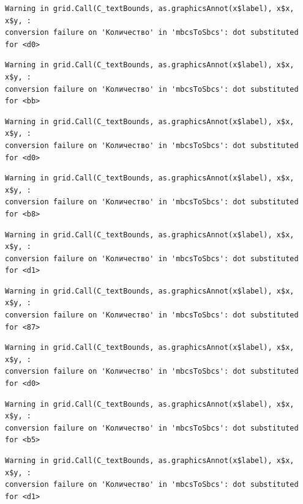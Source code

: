 \documentclass[
  letterpaper,
  DIV=11,
  numbers=noendperiod]{scrreprt}
\theoremstyle{definition}
\theoremstyle{remark}
\begin{document}
\begin{verbatim}
Warning in grid.Call(C_textBounds, as.graphicsAnnot(x$label), x$x, x$y, :
conversion failure on 'Количество' in 'mbcsToSbcs': dot substituted for <d0>
\end{verbatim}

\begin{verbatim}
Warning in grid.Call(C_textBounds, as.graphicsAnnot(x$label), x$x, x$y, :
conversion failure on 'Количество' in 'mbcsToSbcs': dot substituted for <bb>
\end{verbatim}

\begin{verbatim}
Warning in grid.Call(C_textBounds, as.graphicsAnnot(x$label), x$x, x$y, :
conversion failure on 'Количество' in 'mbcsToSbcs': dot substituted for <d0>
\end{verbatim}

\begin{verbatim}
Warning in grid.Call(C_textBounds, as.graphicsAnnot(x$label), x$x, x$y, :
conversion failure on 'Количество' in 'mbcsToSbcs': dot substituted for <b8>
\end{verbatim}

\begin{verbatim}
Warning in grid.Call(C_textBounds, as.graphicsAnnot(x$label), x$x, x$y, :
conversion failure on 'Количество' in 'mbcsToSbcs': dot substituted for <d1>
\end{verbatim}

\begin{verbatim}
Warning in grid.Call(C_textBounds, as.graphicsAnnot(x$label), x$x, x$y, :
conversion failure on 'Количество' in 'mbcsToSbcs': dot substituted for <87>
\end{verbatim}

\begin{verbatim}
Warning in grid.Call(C_textBounds, as.graphicsAnnot(x$label), x$x, x$y, :
conversion failure on 'Количество' in 'mbcsToSbcs': dot substituted for <d0>
\end{verbatim}

\begin{verbatim}
Warning in grid.Call(C_textBounds, as.graphicsAnnot(x$label), x$x, x$y, :
conversion failure on 'Количество' in 'mbcsToSbcs': dot substituted for <b5>
\end{verbatim}

\begin{verbatim}
Warning in grid.Call(C_textBounds, as.graphicsAnnot(x$label), x$x, x$y, :
conversion failure on 'Количество' in 'mbcsToSbcs': dot substituted for <d1>
\end{verbatim}
\end{document}
